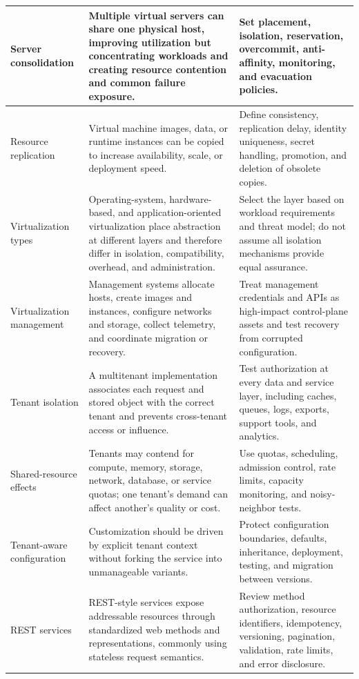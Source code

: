 \documentclass[11pt]{article}
\begin{document}
\begin{longtable}{@{}>{\RaggedRight\arraybackslash}p{}>{\RaggedRight\arraybackslash}p{}>{\RaggedRight\arraybackslash}p{}@{}}
Server consolidation & Multiple virtual servers can share one physical host, improving utilization but concentrating workloads and creating resource contention and common failure exposure. & Set placement, isolation, reservation, overcommit, anti-affinity, monitoring, and evacuation policies. \\\midrule
Resource replication & Virtual machine images, data, or runtime instances can be copied to increase availability, scale, or deployment speed. & Define consistency, replication delay, identity uniqueness, secret handling, promotion, and deletion of obsolete copies. \\\midrule
Virtualization types & Operating-system, hardware-based, and application-oriented virtualization place abstraction at different layers and therefore differ in isolation, compatibility, overhead, and administration. & Select the layer based on workload requirements and threat model; do not assume all isolation mechanisms provide equal assurance. \\\midrule
Virtualization management & Management systems allocate hosts, create images and instances, configure networks and storage, collect telemetry, and coordinate migration or recovery. & Treat management credentials and APIs as high-impact control-plane assets and test recovery from corrupted configuration. \\\midrule
Tenant isolation & A multitenant implementation associates each request and stored object with the correct tenant and prevents cross-tenant access or influence. & Test authorization at every data and service layer, including caches, queues, logs, exports, support tools, and analytics. \\\midrule
Shared-resource effects & Tenants may contend for compute, memory, storage, network, database, or service quotas; one tenant's demand can affect another's quality or cost. & Use quotas, scheduling, admission control, rate limits, capacity monitoring, and noisy-neighbor tests. \\\midrule
Tenant-aware configuration & Customization should be driven by explicit tenant context without forking the service into unmanageable variants. & Protect configuration boundaries, defaults, inheritance, deployment, testing, and migration between versions. \\\midrule
REST services & REST-style services expose addressable resources through standardized web methods and representations, commonly using stateless request semantics. & Review method authorization, resource identifiers, idempotency, versioning, pagination, validation, rate limits, and error disclosure. \\\midrule

\end{longtable}
\end{document}
